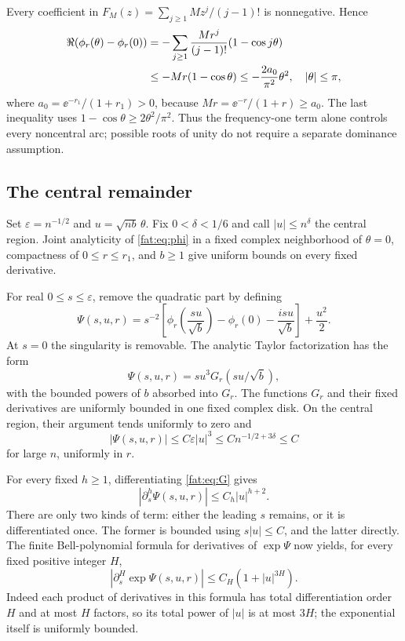 \documentclass[11pt,letterpaper]{article}
\numberwithin{equation}{section}
\theoremstyle{remark}\newtheorem{remark}[theorem]{Remark}
\begin{document}
Every coefficient in $F_M(z)=\sum_{j\ge1}Mz^j/(j-1)!$ is nonnegative. Hence
\begin{align}
 \Re(\phi_r(\theta)-\phi_r(0))
 &=-\sum_{j\ge1}\frac{Mr^j}{(j-1)!}(1-\cos j\theta)\notag\\
 &\le-Mr(1-\cos\theta)
 \le-\frac{2a_0}{\pi^2}\theta^2,\quad |\theta|\le\pi,\label{fat:eq:damping}
\end{align}
where $a_0=\ee^{-r_1}/(1+r_1)>0$, because $Mr=\ee^{-r}/(1+r)\ge a_0$. The last inequality uses $1-\cos\theta\ge2\theta^2/\pi^2$. Thus the frequency-one term alone controls every noncentral arc; possible roots of unity do not require a separate dominance assumption.

\subsection{The central remainder}
Set $\varepsilon=n^{-1/2}$ and $u=\sqrt{nb}\,\theta$. Fix $0<\delta<1/6$ and call $|u|\le n^\delta$ the central region. Joint analyticity of \eqref{fat:eq:phi} in a fixed complex neighborhood of $\theta=0$, compactness of $0\le r\le r_1$, and $b\ge1$ give uniform bounds on every fixed derivative.

For real $0\le s\le\varepsilon$, remove the quadratic part by defining
\begin{equation}\label{fat:eq:Psi}
 \Psi(s,u,r)=s^{-2}
 \left[\phi_r\left(\frac{su}{\sqrt b}\right)-\phi_r(0)
       -\frac{isu}{\sqrt b}\right]+\frac{u^2}{2}.
\end{equation}
At $s=0$ the singularity is removable. The analytic Taylor factorization has the form
\begin{equation}\label{fat:eq:G}
 \Psi(s,u,r)=su^3G_r(su/\sqrt b),
\end{equation}
with the bounded powers of $b$ absorbed into $G_r$. The functions $G_r$ and their fixed derivatives are uniformly bounded in one fixed complex disk. On the central region, their argument tends uniformly to zero and
\[
 |\Psi(s,u,r)|\le C\varepsilon|u|^3
 \le Cn^{-1/2+3\delta}\le C
\]
for large $n$, uniformly in $r$.

For every fixed $h\ge1$, differentiating \eqref{fat:eq:G} gives
\begin{equation}\label{fat:eq:derivative}
 |\partial_s^h\Psi(s,u,r)|\le C_h|u|^{h+2}.
\end{equation}
There are only two kinds of term: either the leading $s$ remains, or it is differentiated once. The former is bounded using $s|u|\le C$, and the latter directly. The finite Bell-polynomial formula for derivatives of $\exp\Psi$ now yields, for every fixed positive integer $H$,
\begin{equation}\label{fat:eq:bellbound}
 |\partial_s^H\exp\Psi(s,u,r)|\le C_H(1+|u|^{3H}).
\end{equation}
Indeed each product of derivatives in this formula has total differentiation order $H$ and at most $H$ factors, so its total power of $|u|$ is at most $3H$; the exponential itself is uniformly bounded.
\end{document}
